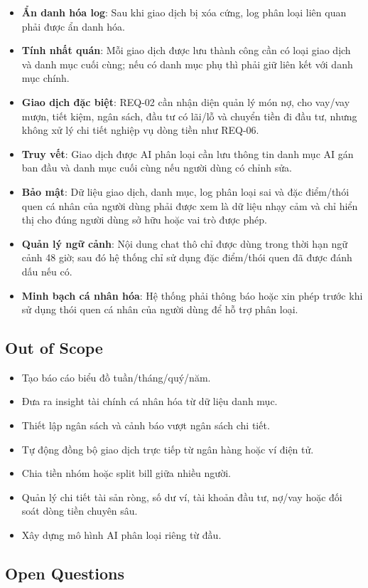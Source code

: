 \begin{itemize}
\item \textbf{Ẩn danh hóa log}: Sau khi giao dịch bị xóa cứng, log phân loại liên quan phải được ẩn danh hóa.
\item \textbf{Tính nhất quán}: Mỗi giao dịch được lưu thành công cần có loại giao dịch và danh mục cuối cùng; nếu có danh mục phụ thì phải giữ liên kết với danh mục chính.
\item \textbf{Giao dịch đặc biệt}: REQ-02 cần nhận diện quản lý món nợ, cho vay/vay mượn, tiết kiệm, ngân sách, đầu tư có lãi/lỗ và chuyển tiền đi đầu tư, nhưng không xử lý chi tiết nghiệp vụ dòng tiền như REQ-06.
\item \textbf{Truy vết}: Giao dịch được AI phân loại cần lưu thông tin danh mục AI gán ban đầu và danh mục cuối cùng nếu người dùng có chỉnh sửa.
\item \textbf{Bảo mật}: Dữ liệu giao dịch, danh mục, log phân loại sai và đặc điểm/thói quen cá nhân của người dùng phải được xem là dữ liệu nhạy cảm và chỉ hiển thị cho đúng người dùng sở hữu hoặc vai trò được phép.
\item \textbf{Quản lý ngữ cảnh}: Nội dung chat thô chỉ được dùng trong thời hạn ngữ cảnh 48 giờ; sau đó hệ thống chỉ sử dụng đặc điểm/thói quen đã được đánh dấu nếu có.
\item \textbf{Minh bạch cá nhân hóa}: Hệ thống phải thông báo hoặc xin phép trước khi sử dụng thói quen cá nhân của người dùng để hỗ trợ phân loại.
\end{itemize}
\subsection{Out of Scope}

\begin{itemize}
\item Tạo báo cáo biểu đồ tuần/tháng/quý/năm.
\item Đưa ra insight tài chính cá nhân hóa từ dữ liệu danh mục.
\item Thiết lập ngân sách và cảnh báo vượt ngân sách chi tiết.
\item Tự động đồng bộ giao dịch trực tiếp từ ngân hàng hoặc ví điện tử.
\item Chia tiền nhóm hoặc split bill giữa nhiều người.
\item Quản lý chi tiết tài sản ròng, số dư ví, tài khoản đầu tư, nợ/vay hoặc đối soát dòng tiền chuyên sâu.
\item Xây dựng mô hình AI phân loại riêng từ đầu.
\end{itemize}
\subsection{Open Questions}

